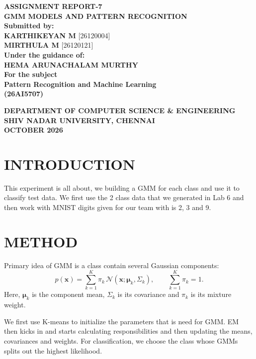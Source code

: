 \documentclass[11pt,a4paper]{article}
\begin{document}
\begin{titlepage}
\centering
\vspace*{2cm}
{\Large\textbf{ASSIGNMENT REPORT-7}}\\[0.7cm]
{\large\textbf{GMM MODELS AND PATTERN RECOGNITION}}\\[1.7cm]
\textbf{Submitted by:}\\[0.4cm]
\textbf{KARTHIKEYAN M} [26120004]\\[0.3cm]
\textbf{MIRTHULA M} [26120121]\\[1.8cm]
\textbf{Under the guidance of:}\\[0.4cm]
\textbf{HEMA ARUNACHALAM MURTHY}\\[1.5cm]
\textbf{For the subject}\\[0.4cm]
{\Large\textbf{Pattern Recognition and Machine Learning}}\\[0.3cm]
\textbf{(26AI5707)}
\vspace{2cm}

{\textbf{DEPARTMENT OF COMPUTER SCIENCE \& ENGINEERING}\\[0.3cm]
\textbf{SHIV NADAR UNIVERSITY, CHENNAI}\\[0.3cm]
\textbf{OCTOBER 2026}}
\end{titlepage}

\section*{INTRODUCTION}
This experiment is all about, we building a GMM for each class and use it to classify test data. We first use the 2 class data that we generated in Lab 6 and then work with MNIST digits given for our team with is 2, 3 and 9.

\section*{METHOD}
Primary idea of GMM is a class contain several Gaussian components:
\[
p(\mathbf{x})=\sum_{k=1}^{K}\pi_k\,\mathcal{N}(\mathbf{x};\boldsymbol{\mu}_k,\Sigma_k),
\qquad \sum_{k=1}^{K}\pi_k=1.
\]
Here, $\boldsymbol{\mu}_k$ is the component mean, $\Sigma_k$ is its covariance and $\pi_k$ is its mixture weight.

We first use K-means to initialize the parameters that is need for  GMM. EM then kicks in and starts calculating responsibilities and then updating the means, covariances and weights. For classification, we choose the class whose GMMs splits out the highest likelihood.
\end{document}
